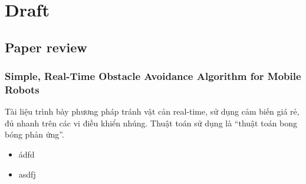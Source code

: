 \chapter{Draft}
\label{cha:draft}

\section{Paper review}
\label{sec:paper-review}

\subsection{Simple, Real-Time Obstacle Avoidance Algorithm for Mobile Robots}
Tài liệu \cite{Susnea2009} trình bày phương pháp tránh vật cản real-time, sử dụng cảm biến giá rẻ, đủ nhanh trên các vi điều khiển nhúng. Thuật toán sử dụng là ``thuật toán bong bóng phản ứng''.
\begin{itemize}
\item ádfd
  
\item asdfj 
\end{itemize}


